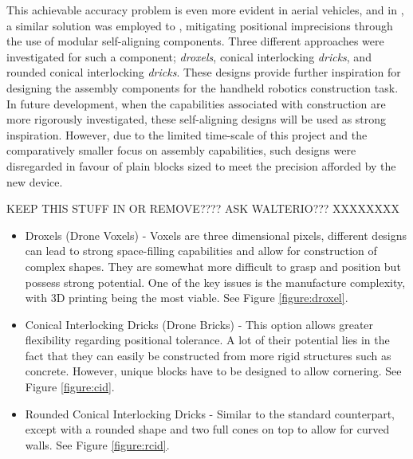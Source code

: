 \documentclass[11pt]{article}
\begin{document}
This achievable accuracy problem is even more evident in aerial vehicles, and in \cite{latteur2015}, a similar solution was employed to \cite{Petersen2011}, mitigating positional imprecisions through the use of modular self-aligning components. Three different approaches were investigated for such a component; \textit{droxels}, conical interlocking \textit{dricks}, and rounded conical interlocking \textit{dricks}. These designs provide further inspiration for designing the assembly components for the handheld robotics construction task. In future development, when the capabilities associated with construction are more rigorously investigated, these self-aligning designs will be used as strong inspiration. However, due to the limited time-scale of this project and the comparatively smaller focus on assembly capabilities, such designs were disregarded in favour of plain blocks sized to meet the precision afforded by the new device.

KEEP THIS STUFF IN OR REMOVE???? ASK WALTERIO??? XXXXXXXX

\begin{itemize}
\item{Droxels (Drone Voxels) - Voxels are three dimensional pixels, different designs can lead to strong space-filling capabilities and allow for construction of complex shapes. They are somewhat more difficult to grasp and position but possess strong potential. One of the key issues is the manufacture complexity, with 3D printing being the most viable. See Figure \ref{figure:droxel}.}
\item{Conical Interlocking Dricks (Drone Bricks) - This option allows greater flexibility regarding positional tolerance. A lot of their potential lies in the fact that they can easily be constructed from more rigid structures such as concrete. However, unique blocks have to be designed to allow cornering. See Figure \ref{figure:cid}.}
\item{Rounded Conical Interlocking Dricks - Similar to the standard counterpart, except with a rounded shape and two full cones on top to allow for curved walls. See Figure \ref{figure:rcid}.}
\end{itemize}
\end{document}
